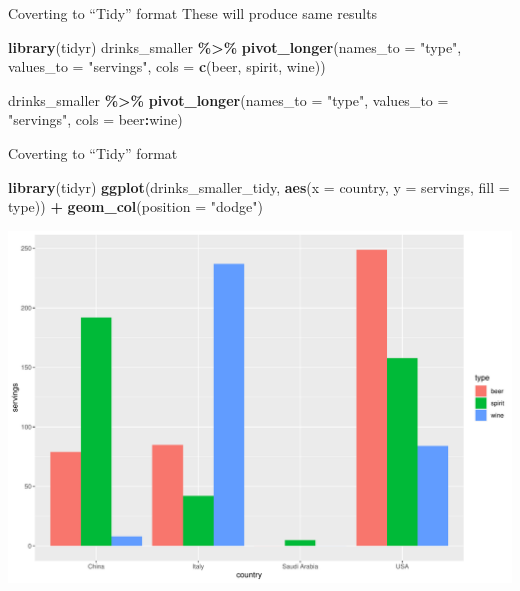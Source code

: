\documentclass[
  ignorenonframetext,
]{beamer}
\newenvironment{Shaded}{\begin{snugshade}}{\end{snugshade}}
\newcommand{\AttributeTok}[1]{\textcolor[rgb]{0.13,0.29,0.53}{#1}}
\newcommand{\FunctionTok}[1]{\textcolor[rgb]{0.13,0.29,0.53}{\textbf{#1}}}
\newcommand{\NormalTok}[1]{#1}
\newcommand{\SpecialCharTok}[1]{\textcolor[rgb]{0.81,0.36,0.00}{\textbf{#1}}}
\newcommand{\StringTok}[1]{\textcolor[rgb]{0.31,0.60,0.02}{#1}}
\begin{document}
\begin{frame}[fragile]{Coverting to ``Tidy'' format}
\protect\hypertarget{coverting-to-tidy-format-1}{}
These will produce same results \tiny

\begin{Shaded}
\begin{Highlighting}[]
\FunctionTok{library}\NormalTok{(tidyr)}
\NormalTok{drinks\_smaller }\SpecialCharTok{\%\textgreater{}\%} 
  \FunctionTok{pivot\_longer}\NormalTok{(}\AttributeTok{names\_to =} \StringTok{"type"}\NormalTok{, }
               \AttributeTok{values\_to =} \StringTok{"servings"}\NormalTok{, }
               \AttributeTok{cols =} \FunctionTok{c}\NormalTok{(beer, spirit, wine))}


\NormalTok{drinks\_smaller }\SpecialCharTok{\%\textgreater{}\%} 
  \FunctionTok{pivot\_longer}\NormalTok{(}\AttributeTok{names\_to =} \StringTok{"type"}\NormalTok{, }
               \AttributeTok{values\_to =} \StringTok{"servings"}\NormalTok{, }
               \AttributeTok{cols =}\NormalTok{ beer}\SpecialCharTok{:}\NormalTok{wine)}
\end{Highlighting}
\end{Shaded}

\normalsize
\end{frame}

\begin{frame}[fragile]{Coverting to ``Tidy'' format}
\protect\hypertarget{coverting-to-tidy-format-2}{}
\tiny

\begin{Shaded}
\begin{Highlighting}[]
\FunctionTok{library}\NormalTok{(tidyr)}
\FunctionTok{ggplot}\NormalTok{(drinks\_smaller\_tidy, }\FunctionTok{aes}\NormalTok{(}\AttributeTok{x =}\NormalTok{ country, }\AttributeTok{y =}\NormalTok{ servings, }\AttributeTok{fill =}\NormalTok{ type)) }\SpecialCharTok{+}
  \FunctionTok{geom\_col}\NormalTok{(}\AttributeTok{position =} \StringTok{"dodge"}\NormalTok{)}
\end{Highlighting}
\end{Shaded}

\begin{center}\includegraphics[width=0.8\linewidth,height=0.5\textheight]{Week3_Lect_files/figure-beamer/unnamed-chunk-52-1} \end{center}
\normalsize
\end{frame}
\end{document}
